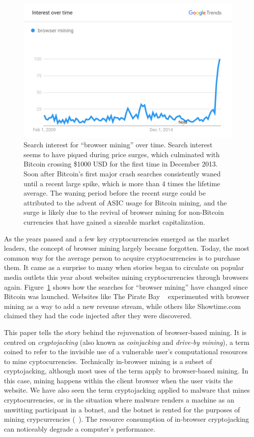 \begin{figure}[t]
\centering
\includegraphics[width=0.9\linewidth]{figures/browser_mining.png}
\caption{Search interest for ``browser mining'' over time. Search interest seems to have piqued during price surges, which culminated with Bitcoin crossing \$1000 USD for the first time in December 2013. Soon after Bitcoin's first major crash searches consistently waned until a recent large spike, which is more than 4 times the lifetime average. The waning period before the recent surge could be attributed to the advent of ASIC usage for Bitcoin mining, and the surge is likely due to the revival of browser mining for non-Bitcoin currencies that have gained a sizeable market capitalization.\label{fig:interest}}
\end{figure}

As the years passed and a few key cryptocurrencies emerged as the market leaders, the concept of browser mining largely became forgotten. Today, the most common way for the average person to acquire cryptocurrencies is to purchase them. It came as a surprise to many when stories began to circulate on popular media outlets this year about websites mining cryptocurrencies through browsers again. Figure~\ref{fig:interest} shows how the searches for ``browser mining'' have changed since Bitcoin was launched. Websites like The Pirate Bay ~\cite{piratesbayhive} experimented with browser mining as a way to add a new revenue stream, while others like Showtime.com ~\cite{showtimehive} claimed they had the code injected after they were discovered. 

This paper tells the story behind the rejuvenation of browser-based mining. It is centred on \textit{cryptojacking} (also known as \textit{coinjacking} and \textit{drive-by mining}), a term coined to refer to the invisible use of a vulnerable user's computational resources to mine cyptocurrencies. Technically in-browser mining is a subset of cryptojacking, although most uses of the term apply to browser-based mining. In this case, mining happens within the client browser when the user visits the website. We have also seen the term cryptojacking applied to malware that mines cryptocurrencies, or in the situation where malware renders a machine as an unwitting participant in a botnet, and the botnet is rented for the purposes of mining crypcurrencies (\cf~\cite{huang2014botcoin}). The resource consumption of in-browser cryptojacking can noticeably degrade a computer's performance.

